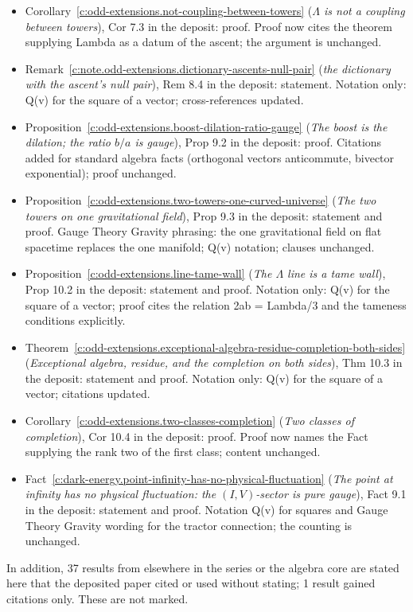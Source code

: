 \documentclass[11pt]{article}
\theoremstyle{definition}
\theoremstyle{plain}
\begin{document}
\begin{itemize}
\item Corollary~\ref{c:odd-extensions.not-coupling-between-towers} (\emph{$\Lambda$ is not a coupling between towers}), Cor 7.3 in the deposit: proof. Proof now cites the theorem supplying Lambda as a datum of the ascent; the argument is unchanged.
\item Remark~\ref{c:note.odd-extensions.dictionary-ascents-null-pair} (\emph{the dictionary with the ascent's null pair}), Rem 8.4 in the deposit: statement. Notation only: Q(v) for the square of a vector; cross-references updated.
\item Proposition~\ref{c:odd-extensions.boost-dilation-ratio-gauge} (\emph{The boost is the dilation; the ratio $b/a$ is gauge}), Prop 9.2 in the deposit: proof. Citations added for standard algebra facts (orthogonal vectors anticommute, bivector exponential); proof unchanged.
\item Proposition~\ref{c:odd-extensions.two-towers-one-curved-universe} (\emph{The two towers on one gravitational field}), Prop 9.3 in the deposit: statement and proof. Gauge Theory Gravity phrasing: the one gravitational field on flat spacetime replaces the one manifold; Q(v) notation; clauses unchanged.
\item Proposition~\ref{c:odd-extensions.line-tame-wall} (\emph{The $\Lambda$ line is a tame wall}), Prop 10.2 in the deposit: statement and proof. Notation only: Q(v) for the square of a vector; proof cites the relation 2ab = Lambda/3 and the tameness conditions explicitly.
\item Theorem~\ref{c:odd-extensions.exceptional-algebra-residue-completion-both-sides} (\emph{Exceptional algebra, residue, and the completion on both sides}), Thm 10.3 in the deposit: statement and proof. Notation only: Q(v) for the square of a vector; citations updated.
\item Corollary~\ref{c:odd-extensions.two-classes-completion} (\emph{Two classes of completion}), Cor 10.4 in the deposit: proof. Proof now names the Fact supplying the rank two of the first class; content unchanged.
\item Fact~\ref{c:dark-energy.point-infinity-has-no-physical-fluctuation} (\emph{The point at infinity has no physical fluctuation: the $(I,V)$-sector is pure gauge}), Fact 9.1 in the deposit: statement and proof. Notation Q(v) for squares and Gauge Theory Gravity wording for the tractor connection; the counting is unchanged.
\end{itemize}
\noindent In addition, 37 results from elsewhere in the series or the algebra core are stated here that the deposited paper cited or used without stating; 1 result gained citations only. These are not marked.
\end{document}
